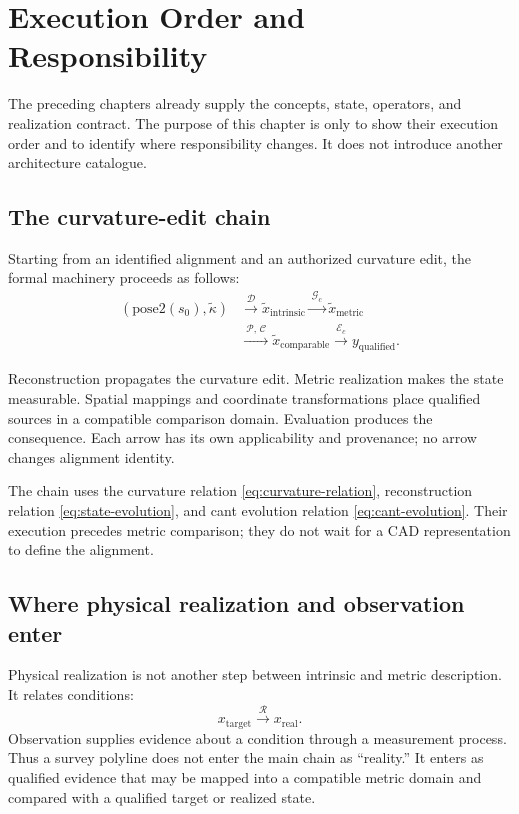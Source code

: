 
\chapter{Execution Order and Responsibility}
\label{chap:system-layers}

The preceding chapters already supply the concepts, state, operators,
and realization contract. The purpose of this chapter is only to show
their execution order and to identify where responsibility changes. It
does not introduce another architecture catalogue.

\section{The curvature-edit chain}

Starting from an identified alignment and an authorized curvature edit,
the formal machinery proceeds as follows:
\[
\begin{aligned}
(\mathrm{pose2}(s_0),\widetilde\kappa)
&\xrightarrow{\ \mathcal D\ }
\widetilde x_{\mathrm{intrinsic}}
\xrightarrow{\ \mathcal G_c\ }
\widetilde x_{\mathrm{metric}}\\
&\xrightarrow{\ \mathcal P,\,\mathcal C\ }
\widetilde x_{\mathrm{comparable}}
\xrightarrow{\ \mathcal E_c\ }
y_{\mathrm{qualified}}.
\end{aligned}
\]

Reconstruction propagates the curvature edit. Metric realization makes
the state measurable. Spatial mappings and coordinate transformations
place qualified sources in a compatible comparison domain. Evaluation
produces the consequence. Each arrow has its own applicability and
provenance; no arrow changes alignment identity.

The chain uses the curvature relation
\cref{eq:curvature-relation}, reconstruction relation
\cref{eq:state-evolution}, and cant evolution relation
\cref{eq:cant-evolution}. Their execution precedes metric comparison;
they do not wait for a CAD representation to define the alignment.

\section{Where physical realization and observation enter}

Physical realization is not another step between intrinsic and metric
description. It relates conditions:
\[
x_{\mathrm{target}}
\xrightarrow{\ \mathcal R\ }
x_{\mathrm{real}}.
\]
Observation supplies evidence about a condition through a measurement
process. Thus a survey polyline does not enter the main chain as
``reality.'' It enters as qualified evidence that may be mapped into a
compatible metric domain and compared with a qualified target or
realized state.

